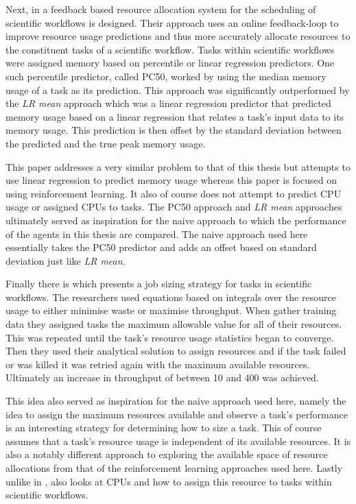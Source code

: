Next, in \cite{FeedbackBasedAllocation} a feedback based resource allocation system for the scheduling of scientific workflows is designed. Their approach uses an online feedback-loop to improve resource usage predictions and thus more accurately allocate resources to the constituent tasks of a scientific workflow. Tasks within scientific workflows were assigned memory based on percentile or linear regression predictors. One such percentile predictor, called PC50, worked by using the median memory usage of a task as its prediction. This approach was significantly outperformed by the \textit{LR mean} approach which was a linear regression predictor that predicted memory usage based on a linear regression that relates a task’s input data to its memory usage. This prediction is then offset by the standard deviation between the predicted and the true peak memory usage.

This paper addresses a very similar problem to that of this thesis but attempts to use linear regression to predict memory usage whereas this paper is focused on using reinforcement learning. It also of course does not attempt to predict CPU usage or assigned CPUs to tasks. The PC50 approach and \textit{LR mean} approaches ultimately served as inspiration for the naive approach to which the performance of the agents in this thesis are compared. The naive approach used here essentially takes the PC50 predictor and adds an offset based on standard deviation just like \textit{LR mean}. 

Finally there is \cite{tovarjob} which presents a job sizing strategy for tasks in scientific workflows. The researchers used equations based on integrals over the resource usage to either minimise waste or maximise throughput. When gather training data they assigned tasks the maximum allowable value for all of their resources. This was repeated until the task’s resource usage statistics began to converge. Then they used their analytical solution to assign resources and if the task failed or was killed it was retried again with the maximum available resources. Ultimately an increase in throughput of between 10 and 400 was achieved.

This idea also served as inspiration for the naive approach used here, namely the idea to assign the maximum resources available and observe a task’s performance is an interesting strategy for determining how to size a task. This of course assumes that a task’s resource usage is independent of its available resources. It is also a notably different approach to exploring the available space of resource allocations from that of the reinforcement learning approaches used here. Lastly unlike in \cite{FeedbackBasedAllocation}, \cite{tovarjob} also looks at CPUs and how to assign this resource to tasks within scientific workflows.

